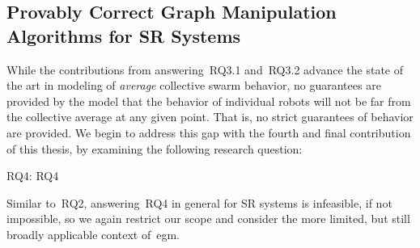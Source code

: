 \subsection{Provably Correct Graph Manipulation Algorithms for SR Systems}

While the contributions from answering~\gls{RQ3.1} and~\gls{RQ3.2} advance the
state of the art in modeling of \emph{average} collective swarm behavior, no
guarantees are provided by the model that the behavior of individual robots will
not be far from the collective average at any given point. That is, no strict
guarantees of behavior are provided. We begin to address this gap with the
fourth and final contribution of this thesis, by examining the following
research question:

\medskip\noindent
\gls{RQ4}: \glsdesc{RQ4}
\medskip

\noindent
Similar to~\gls{RQ2}, answering~\gls{RQ4} in general for SR systems is
infeasible, if not impossible, so we again restrict our scope and consider the
more limited, but still broadly applicable context of~\gls{egm}.



